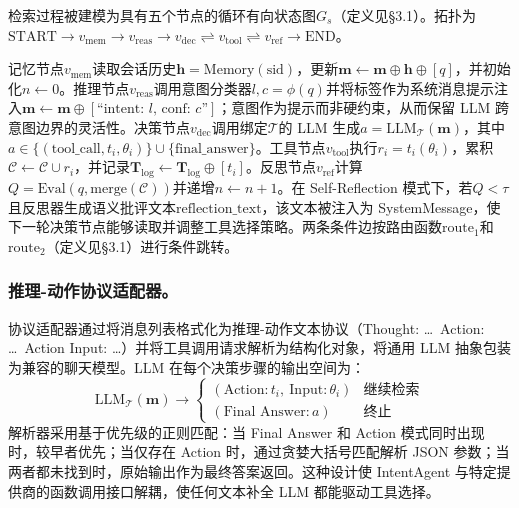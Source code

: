 \documentclass[runningheads]{llncs}
\begin{document}
检索过程被建模为具有五个节点的循环有向状态图$G_s$（定义见§3.1）。拓扑为$\text{START} \to v_{\text{mem}} \to v_{\text{reas}} \to v_{\text{dec}} \rightleftharpoons v_{\text{tool}} \rightleftharpoons v_{\text{ref}} \to \text{END}$。

记忆节点$v_{\text{mem}}$读取会话历史$\mathbf{h} = \text{Memory}(\text{sid})$，更新$\mathbf{m} \leftarrow \mathbf{m} \oplus \mathbf{h} \oplus [q]$，并初始化$n \leftarrow 0$。推理节点$v_{\text{reas}}$调用意图分类器$l, c = \phi(q)$并将标签作为系统消息提示注入$\mathbf{m} \leftarrow \mathbf{m} \oplus [\text{``intent: } l \text{, conf: } c\text{''}]$；意图作为提示而非硬约束，从而保留 LLM 跨意图边界的灵活性。决策节点$v_{\text{dec}}$调用绑定$\mathcal{T}$的 LLM 生成$a = \text{LLM}_{\mathcal{T}}(\mathbf{m})$，其中$a \in \{(\text{tool\_call}, t_i, \theta_i)\} \cup \{\text{final\_answer}\}$。工具节点$v_{\text{tool}}$执行$r_i = t_i(\theta_i)$，累积$\mathcal{C} \leftarrow \mathcal{C} \cup r_i$，并记录$\mathbf{T}_{\log} \leftarrow \mathbf{T}_{\log} \oplus [t_i]$。反思节点$v_{\text{ref}}$计算$Q = \text{Eval}(q, \text{merge}(\mathcal{C}))$并递增$n \leftarrow n + 1$。在 Self-Reflection 模式下，若$Q < \tau$且反思器生成语义批评文本$\text{reflection\_text}$，该文本被注入为 SystemMessage，使下一轮决策节点能够读取并调整工具选择策略。两条条件边按路由函数$\text{route}_1$和$\text{route}_2$（定义见§3.1）进行条件跳转。

\subsubsection{推理-动作协议适配器。}

协议适配器通过将消息列表格式化为推理-动作文本协议（Thought: \ldots\ Action: \ldots\ Action Input: \ldots）并将工具调用请求解析为结构化对象，将通用 LLM 抽象包装为兼容的聊天模型。LLM 在每个决策步骤的输出空间为：
\begin{equation}
    \text{LLM}_{\mathcal{T}}(\mathbf{m}) \to \begin{cases}
    (\text{Action}: t_i,\ \text{Input}: \theta_i) & \text{继续检索} \\
    (\text{Final Answer}: a) & \text{终止}
    \end{cases}
\end{equation}
解析器采用基于优先级的正则匹配：当 Final Answer 和 Action 模式同时出现时，较早者优先；当仅存在 Action 时，通过贪婪大括号匹配解析 JSON 参数；当两者都未找到时，原始输出作为最终答案返回。这种设计使 IntentAgent 与特定提供商的函数调用接口解耦，使任何文本补全 LLM 都能驱动工具选择。
\end{document}
